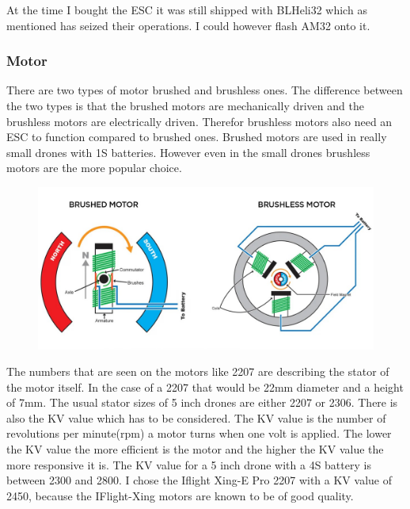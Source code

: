 \documentclass{article}
\begin{document}
	At the time I bought the \gls{ESC} it was still shipped with BLHeli32 which as mentioned has seized their operations. I could however flash AM32 onto it.

	\subsubsection{Motor}
	There are two types of motor brushed and brushless ones. The difference between the two types is that the brushed motors are mechanically driven and the brushless motors are electrically driven. Therefor brushless motors also need an ESC to function compared to brushed ones. Brushed motors are used in really small drones with 1S batteries. However even in the small drones brushless motors are the more popular choice\cite{brush/lessmotors}. 
\begin{figure}[h]
	\centering
	\includegraphics[scale=0.2]{pictures/motor}
	\caption{\cite{picturemotor}}
	\label{fig:motor}
\end{figure}

	The numbers that are seen on the motors like 2207 are describing the stator of the motor itself. In the case of a 2207 that would be 22mm diameter and a height of 7mm. The usual stator sizes of 5 inch drones are either 2207 or 2306. There is also the KV value which has to be considered. The KV value is the number of revolutions per minute(rpm) a motor turns when one volt is applied. The lower the KV value the more efficient is the motor and the higher the KV value the more responsive it is. The KV value for a 5 inch drone with a 4S battery is between 2300 and 2800. I chose the Iflight Xing-E Pro 2207\cite{xingepro} with a KV value of 2450, because the IFlight-Xing motors are known to be of good quality. 


	
\end{document}
